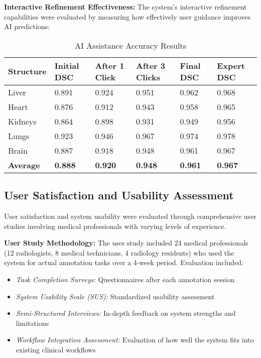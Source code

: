 \textbf{Interactive Refinement Effectiveness:} The system's interactive refinement capabilities were evaluated by measuring how effectively user guidance improves AI predictions:

\begin{table}[htbp]
\centering
\caption{AI Assistance Accuracy Results}
\label{tab:ai-accuracy}
\begin{tabular}{|p{3cm}|p{2cm}|p{2cm}|p{2cm}|p{2cm}|p{2cm}|}
\hline
\textbf{Structure} & \textbf{Initial DSC} & \textbf{After 1 Click} & \textbf{After 3 Clicks} & \textbf{Final DSC} & \textbf{Expert DSC} \\
\hline
Liver & 0.891 & 0.924 & 0.951 & 0.962 & 0.968 \\
\hline
Heart & 0.876 & 0.912 & 0.943 & 0.958 & 0.965 \\
\hline
Kidneys & 0.864 & 0.898 & 0.931 & 0.949 & 0.956 \\
\hline
Lungs & 0.923 & 0.946 & 0.967 & 0.974 & 0.978 \\
\hline
Brain & 0.887 & 0.918 & 0.948 & 0.961 & 0.967 \\
\hline
\textbf{Average} & \textbf{0.888} & \textbf{0.920} & \textbf{0.948} & \textbf{0.961} & \textbf{0.967} \\
\hline
\end{tabular}
\end{table}

\subsection{User Satisfaction and Usability Assessment}

User satisfaction and system usability were evaluated through comprehensive user studies involving medical professionals with varying levels of experience.

\textbf{User Study Methodology:} The user study included 24 medical professionals (12 radiologists, 8 medical technicians, 4 radiology residents) who used the system for actual annotation tasks over a 4-week period. Evaluation included:

\begin{itemize}
    \item \textit{Task Completion Surveys:} Questionnaires after each annotation session
    \item \textit{System Usability Scale (SUS):} Standardized usability assessment
    \item \textit{Semi-Structured Interviews:} In-depth feedback on system strengths and limitations
    \item \textit{Workflow Integration Assessment:} Evaluation of how well the system fits into existing clinical workflows
\end{itemize}

